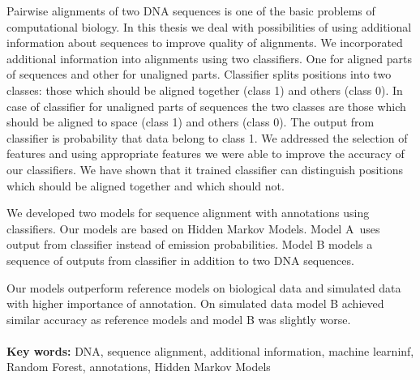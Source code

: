 Pairwise alignments of two DNA sequences is one of the basic problems of computational biology. In this thesis we deal with possibilities of using additional information about sequences to improve quality of alignments.
We incorporated additional information into alignments using two classifiers. One for aligned parts of sequences and other for unaligned parts.
Classifier splits positions into two classes: those which should be aligned together (class 1) and others (class 0). In case of classifier for unaligned parts of sequences the two classes are those which should be aligned to space (class 1) and others (class 0). The output from classifier is probability that data belong to class 1.
We addressed the selection of features and using appropriate features we were able to improve the accuracy of our classifiers.
We have shown that it trained classifier can distinguish positions which should be aligned together and which should not.

We developed two models for sequence alignment with annotations using classifiers. Our models are based on Hidden Markov Models.
Model A~uses output from classifier instead of emission probabilities.
Model B models a sequence of outputs from classifier in addition to two DNA sequences.

Our models outperform reference models on biological data and simulated data with higher importance of annotation.
On simulated data model B achieved similar accuracy as reference models and model B was slightly worse.
\\ \\
{\bf Key words:} DNA, sequence alignment, additional information, machine learninf, Random Forest, annotations, Hidden Markov Models
